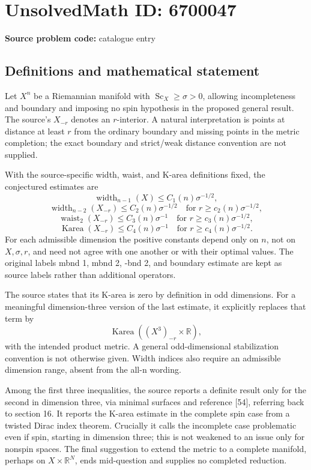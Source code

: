 \documentclass[11pt]{article}
\newcommand{\R}{\mathbb{R}}
\begin{document}
\section*{UnsolvedMath ID: 6700047}
\textbf{Source problem code:} catalogue entry
\subsection{Definitions and mathematical statement}
Let \(X^n\) be a Riemannian manifold with \(\operatorname{Sc}_X\ge\sigma>0\), allowing incompleteness and boundary and imposing no spin hypothesis in the proposed general result. The source's \(X_{-r}\) denotes an \(r\)-interior. A natural interpretation is points at distance at least \(r\) from the ordinary boundary and missing points in the metric completion; the exact boundary and strict/weak distance convention are not supplied.

With the source-specific width, waist, and K-area definitions fixed, the conjectured estimates are
\[
\operatorname{width}_{n-1}(X)\le C_1(n)\sigma^{-1/2},
\]
\[
\operatorname{width}_{n-2}(X_{-r})\le C_2(n)\sigma^{-1/2}
\quad\text{for }r\ge c_2(n)\sigma^{-1/2},
\]
\[
\operatorname{waist}_{2}(X_{-r})\le C_3(n)\sigma^{-1}
\quad\text{for }r\ge c_3(n)\sigma^{-1/2},
\]
\[
\operatorname{Karea}(X_{-r})\le C_4(n)\sigma^{-1}
\quad\text{for }r\ge c_4(n)\sigma^{-1/2}.
\]
For each admissible dimension the positive constants depend only on \(n\), not on \(X,\sigma,r\), and need not agree with one another or with their optimal values. The original labels mbnd 1, mbnd 2, -bnd 2, and boundary estimate are kept as source labels rather than additional operators.

The source states that its K-area is zero by definition in odd dimensions. For a meaningful dimension-three version of the last estimate, it explicitly replaces that term by
\[
\operatorname{Karea}((X^3)_{-r}\times\R),
\]
with the intended product metric. A general odd-dimensional stabilization convention is not otherwise given. Width indices also require an admissible dimension range, absent from the all-n wording.

Among the first three inequalities, the source reports a definite result only for the second in dimension three, via minimal surfaces and reference [54], referring back to section 16. It reports the K-area estimate in the complete spin case from a twisted Dirac index theorem. Crucially it calls the incomplete case problematic even if spin, starting in dimension three; this is not weakened to an issue only for nonspin spaces. The final suggestion to extend the metric to a complete manifold, perhaps on \(X\times\R^N\), ends mid-question and supplies no completed reduction.
\end{document}
